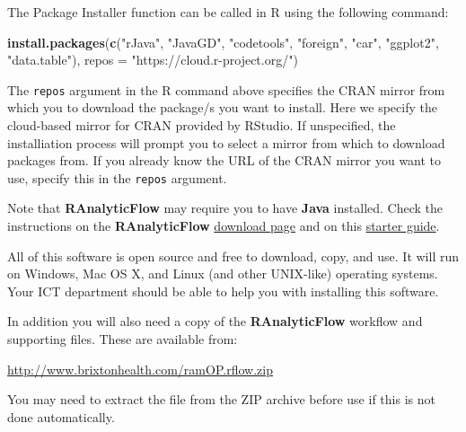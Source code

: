 \documentclass[12pt,a4paper]{book}
\newenvironment{Shaded}{\begin{snugshade}}{\end{snugshade}}
\newcommand{\KeywordTok}[1]{\textcolor[rgb]{0.13,0.29,0.53}{\textbf{#1}}}
\newcommand{\DataTypeTok}[1]{\textcolor[rgb]{0.13,0.29,0.53}{#1}}
\newcommand{\StringTok}[1]{\textcolor[rgb]{0.31,0.60,0.02}{#1}}
\newcommand{\NormalTok}[1]{#1}
\theoremstyle{definition}
\theoremstyle{definition}
\theoremstyle{definition}
\theoremstyle{remark}
\begin{document}
The Package Installer function can be called in R using the following
command:

\begin{Shaded}
\begin{Highlighting}[]
\KeywordTok{install.packages}\NormalTok{(}\KeywordTok{c}\NormalTok{(}\StringTok{"rJava"}\NormalTok{, }\StringTok{"JavaGD"}\NormalTok{, }\StringTok{"codetools"}\NormalTok{, }
                   \StringTok{"foreign"}\NormalTok{, }\StringTok{"car"}\NormalTok{, }\StringTok{"ggplot2"}\NormalTok{, }\StringTok{"data.table"}\NormalTok{), }
                   \DataTypeTok{repos =} \StringTok{"https://cloud.r-project.org/"}\NormalTok{)}
\end{Highlighting}
\end{Shaded}

The \texttt{repos} argument in the R command above specifies the CRAN
mirror from which you to download the package/s you want to install.
Here we specify the cloud-based mirror for CRAN provided by RStudio. If
unspecified, the installiation process will prompt you to select a
mirror from which to download packages from. If you already know the URL
of the CRAN mirror you want to use, specify this in the \texttt{repos}
argument.

Note that \textbf{RAnalyticFlow} may require you to have \textbf{Java}
installed. Check the instructions on the \textbf{RAnalyticFlow}
\href{http://r.analyticflow.com/en/download/}{download page} and on this
\href{http://download.ef-prime.com/ranalyticflow/3.1.5/readme.html}{starter
guide}.

All of this software is open source and free to download, copy, and use.
It will run on Windows, Mac OS X, and Linux (and other UNIX-like)
operating systems. Your ICT department should be able to help you with
installing this software.

In addition you will also need a copy of the \textbf{RAnalyticFlow}
workflow and supporting files. These are available from:

\url{http://www.brixtonhealth.com/ramOP.rflow.zip}

You may need to extract the file from the ZIP archive before use if this
is not done automatically.
\end{document}
